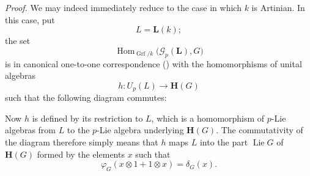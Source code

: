 \textit{Proof.}
We may indeed immediately reduce to the case in which \(k\) is
Artinian. In this case, put
\[
  L=\mathbf L(k);
\]
the set
\[
  \operatorname{Hom}_{\operatorname{Grf}/k}
    \bigl(\mathscr G_p(\mathbf L),G\bigr)
\]
is in canonical one-to-one correspondence \textup{()} with the
homomorphisms of unital algebras
\[
  h:U_p(L)\longrightarrow\mathbf H(G)
\]
such that the following diagram commutes:
\begin{center}
  \label{sga3:VIIB:4.2.2:restricted-universal-diagram}
  
\end{center}
Now \(h\) is defined by its restriction to \(L\), which is a
homomorphism of \(p\)-Lie algebras from \(L\) to the \(p\)-Lie algebra
underlying \(\mathbf H(G)\). The commutativity of the diagram therefore
simply means that \(h\) maps \(L\) into the part \(\operatorname{Lie}G\)
of \(\mathbf H(G)\) formed by the elements \(x\) such that
\[
  \varphi_G(x\otimes1+1\otimes x)
  =
  \delta_G(x).
\]
